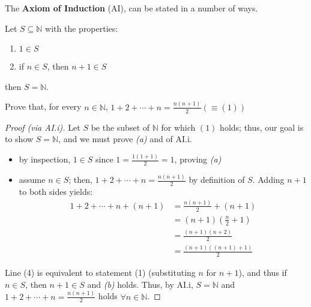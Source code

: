\documentclass[12pt]{article}
\begin{document}
The \textbf{Axiom of Induction} (AI), can be stated in a number of ways. 

\begin{axiom}[AI.i]
  Let $S \subseteq \mathbb{N}$ with the properties:
  \begin{enumerate}[label=(\alph*)]
    \item $1 \in S$ 
    \item if $n \in S$, then $n+1 \in S$\footnotemark
  \end{enumerate}
  then $S = \mathbb{N}$.
\end{axiom}

\begin{example}\label{example:ai.i}
  Prove that, for every $n \in \mathbb{N}$, $1 + 2 + \cdots + n = \frac{n(n+1)}{2} (\equiv (1))$
  \begin{proof}[Proof (via AI.i)]
    Let $S$ be the subset of $\mathbb{N}$ for which $(1)$ holds; thus, our goal is to show $S = \mathbb{N}$, and we must prove \textit{(a)} and  of AI.i.
    \begin{itemize}
      \item by inspection, $1 \in S$ since $1 = \frac{1(1+1)}{2} = 1$, proving \textit{(a)}
      \item assume $n \in S$; then, $1 + 2 + \cdots + n = \frac{n(n+1)}{2}$ by definition of $S$. Adding $n+1$ to both sides yields:
      \begin{align}
        1 + 2 + \cdots + n + (n+1) &= \frac{n(n+1)}{2} + (n+1) \\
        &= (n+1)(\frac{n}{2}+1) \\
        &= \frac{(n+1)(n+2)}{2} \\
        &= \frac{(n+1)((n+1)+1)}{2}
      \end{align}
    \end{itemize}
    Line (4) is equivalent to statement (1) (substituting $n$ for $n+1$), and thus if $n \in S$, then $n+1 \in S$ and \textit{(b)} holds. Thus, by AI.i, $S = \mathbb{N}$ and $1 + 2 + \cdots + n = \frac{n(n+1)}{2}$ holds $\forall n \in \mathbb{N}$.
  \end{proof}
\end{example}
\end{document}

